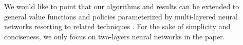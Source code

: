 We would like to point that our algorithms and results can be extended to general value functions and policies parameterized by multi-layered neural networks resorting to related techniques \citep{allen2018convergenceA,allen2018convergenceB,du2018gradientA}. For the sake of simplicity and conciseness, we only focus on two-layers neural networks in the paper.


